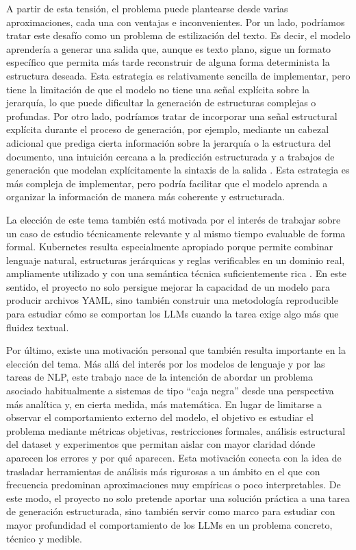 A partir de esta tensión, el problema puede plantearse desde varias aproximaciones, cada una con ventajas e inconvenientes. Por un lado, podríamos tratar este desafío como un problema de estilización del texto. Es decir, el modelo aprendería a generar una salida que,
aunque es texto plano, sigue un formato específico que permita más tarde reconstruir de alguna forma determinista la estructura deseada. Esta estrategia es relativamente sencilla de implementar, pero tiene la limitación de que el modelo no tiene una señal
explícita sobre la jerarquía, lo que puede dificultar la generación de estructuras complejas o profundas. Por otro lado, podríamos tratar de incorporar una señal estructural explícita durante el proceso de generación, por ejemplo, mediante un cabezal adicional
que prediga cierta información sobre la jerarquía o la estructura del documento, una intuición cercana a la predicción estructurada y a trabajos de generación que modelan explícitamente la sintaxis de la salida \citep{joachims2009structured, rabinovich2017asn}. Esta estrategia es más compleja de implementar, pero podría facilitar que el modelo aprenda a organizar la información de manera más coherente y estructurada.

La elección de este tema también está motivada por el interés de trabajar sobre un caso de estudio técnicamente relevante y al mismo tiempo evaluable de forma formal. Kubernetes resulta especialmente apropiado porque permite combinar lenguaje natural, 
estructuras jerárquicas y reglas verificables en un dominio real, ampliamente utilizado y con una semántica técnica suficientemente rica \citep{xu2024cloudevalyaml, angi2025kgen, zhang2024generativeSmells}. En este sentido, el proyecto no solo persigue mejorar la capacidad de un modelo para producir archivos YAML, sino 
también construir una metodología reproducible para estudiar cómo se comportan los LLMs cuando la tarea exige algo más que fluidez textual.

Por último, existe una motivación personal que también resulta importante en la elección del tema. Más allá del interés por los modelos de lenguaje y por las tareas de NLP, este trabajo nace de la intención de abordar un problema asociado habitualmente a 
sistemas de tipo ``caja negra'' desde una perspectiva más analítica y, en cierta medida, más matemática. En lugar de limitarse a observar el comportamiento externo del modelo, el objetivo es estudiar el problema mediante métricas objetivas, restricciones 
formales, análisis estructural del dataset y experimentos que permitan aislar con mayor claridad dónde aparecen los errores y por qué aparecen. Esta motivación conecta con la idea de trasladar herramientas de análisis más rigurosas a un ámbito en el que 
con frecuencia predominan aproximaciones muy empíricas o poco interpretables. De este modo, el proyecto no solo pretende aportar una solución práctica a una tarea de generación estructurada, sino también servir como marco para estudiar con mayor 
profundidad el comportamiento de los LLMs en un problema concreto, técnico y medible.

